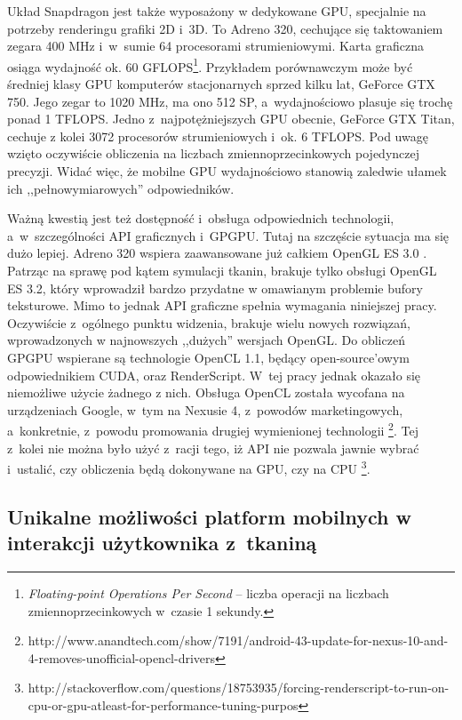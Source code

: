 		Układ Snapdragon jest także wyposażony w dedykowane GPU, specjalnie na potrzeby renderingu grafiki 2D i~3D. To Adreno 320, cechujące się taktowaniem zegara 400 MHz i~w~sumie 64 procesorami strumieniowymi. Karta graficzna osiąga wydajność ok. 60 GFLOPS\footnote{\emph{Floating-point Operations Per Second} -- liczba operacji na liczbach zmiennoprzecinkowych w~czasie 1 sekundy.}. Przykładem porównawczym może być średniej klasy GPU komputerów stacjonarnych sprzed kilku lat, GeForce GTX 750. Jego zegar to 1020 MHz, ma ono 512 SP, a~wydajnościowo plasuje się trochę ponad 1 TFLOPS. Jedno z~najpotężniejszych GPU obecnie, GeForce GTX Titan, cechuje z kolei 3072 procesorów strumieniowych i~ok. 6 TFLOPS. Pod uwagę wzięto oczywiście obliczenia na liczbach zmiennoprzecinkowych pojedynczej precyzji. Widać więc, że mobilne GPU wydajnościowo stanowią zaledwie ułamek ich ,,pełnowymiarowych'' odpowiedników.
		
		Ważną kwestią jest też dostępność i~obsługa odpowiednich technologii, a~w~szczególności API graficznych i~GPGPU. Tutaj na szczęście sytuacja ma się dużo lepiej. Adreno 320 wspiera zaawansowane już całkiem OpenGL ES 3.0 \cite{specs_adreno}. Patrząc na sprawę pod kątem symulacji tkanin, brakuje tylko obsługi OpenGL ES 3.2, który wprowadził bardzo przydatne w omawianym problemie bufory teksturowe. Mimo to jednak API graficzne spełnia wymagania niniejszej pracy. Oczywiście z~ogólnego punktu widzenia, brakuje wielu nowych rozwiązań, wprowadzonych w najnowszych ,,dużych'' wersjach OpenGL. Do obliczeń GPGPU wspierane są technologie OpenCL 1.1, będący open-source'owym odpowiednikiem CUDA, oraz RenderScript. W~tej pracy jednak okazało się niemożliwe użycie żadnego z nich. Obsługa OpenCL została wycofana na urządzeniach Google, w~tym na Nexusie 4, z~powodów marketingowych, a~konkretnie, z~powodu promowania drugiej wymienionej technologii \footnote{http://www.anandtech.com/show/7191/android-43-update-for-nexus-10-and-4-removes-unofficial\allowbreak-opencl-drivers}. Tej z~kolei nie można było użyć z~racji tego, iż API nie pozwala jawnie wybrać i~ustalić, czy obliczenia będą dokonywane na GPU, czy na CPU \footnote{http://stackoverflow.com/questions/18753935/forcing-renderscript-to-run-on-cpu-or-gpu-atleast\allowbreak-for-performance-tuning-purpos}.
		
		\subsection{Unikalne możliwości platform mobilnych w interakcji użytkownika z~tkaniną}
		\label{t:technologie:mobilne:interakcja}
		
